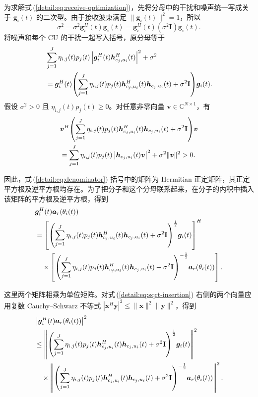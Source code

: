 \documentclass[11pt,a4paper]{ctexart}
\begin{document}
为求解式\,(\ref{detail:eq:receive-optimization})，先将分母中的干扰和噪声统一写成关于 $\bm g_i(t)$ 的二次型。由于接收波束满足 $\|\bm g_i(t)\|^2=1$，所以
\begin{equation}
\sigma^2=\sigma^2\bm g_i^H(t)\bm g_i(t)
=\bm g_i^H(t)(\sigma^2\mathbf I)\bm g_i(t).
\end{equation}
将噪声和每个 CU 的干扰一起写入括号，原分母等于
\begin{align}\label{detail:eq:denominator}
&\sum_{j=1}^J\eta_{i,j}(t)p_j(t)
\left|\bm g_i^H(t)\bm h_{c_j,u_i}^{H}(t)\right|^2+\sigma^2\notag\\
&=\bm g_i^H(t)\!\left(\sum_{j=1}^J\eta_{i,j}(t)p_j(t)
\bm h_{c_j,u_i}^{H}(t)\bm h_{c_j,u_i}(t)+\sigma^2\mathbf I\right)\!\bm g_i(t).
\end{align}
假设 $\sigma^2>0$ 且 $\eta_{i,j}(t)p_j(t)\ge0$。对任意非零向量 $\bm v\in\mathbb C^{N\times1}$，有
\begin{align}
&\bm v^H\!\left(\sum_{j=1}^J\eta_{i,j}(t)p_j(t)
\bm h_{c_j,u_i}^{H}(t)\bm h_{c_j,u_i}(t)+\sigma^2\mathbf I\right)\!\bm v\notag\\
&=\sum_{j=1}^J\eta_{i,j}(t)p_j(t)
\left|\bm h_{c_j,u_i}(t)\bm v\right|^2+\sigma^2\|\bm v\|^2>0.
\end{align}
\begin{samepage}
因此，式\,(\ref{detail:eq:denominator}) 括号中的矩阵为 Hermitian 正定矩阵，其正定平方根及逆平方根均存在。为了把分子和这个分母联系起来，在分子的内积中插入该矩阵的平方根及逆平方根，得到
\begin{align}\label{detail:eq:sqrt-insertion}
&\bm g_i^H(t)\bm a_r(\theta_i(t))\notag\\
&=\left[\left(\sum_{j=1}^J\eta_{i,j}(t)p_j(t)
\bm h_{c_j,u_i}^{H}(t)\bm h_{c_j,u_i}(t)+\sigma^2\mathbf I\right)^{\frac12}\!\bm g_i(t)\right]^H\notag\\
&\quad\times\left[\left(\sum_{j=1}^J\eta_{i,j}(t)p_j(t)
\bm h_{c_j,u_i}^{H}(t)\bm h_{c_j,u_i}(t)+\sigma^2\mathbf I\right)^{-\frac12}\!\bm a_r(\theta_i(t))\right].
\end{align}
\end{samepage}
\begin{samepage}
这里两个矩阵相乘为单位矩阵。对式\,(\ref{detail:eq:sqrt-insertion}) 右侧的两个向量应用复数 Cauchy--Schwarz 不等式 $|\bm x^H\bm y|^2\le\|\bm x\|^2\|\bm y\|^2$，得到
\begin{align}\label{detail:eq:cs-norms}
&\left|\bm g_i^H(t)\bm a_r(\theta_i(t))\right|^2\notag\\
&\le\left\|\left(\sum_{j=1}^J\eta_{i,j}(t)p_j(t)
\bm h_{c_j,u_i}^{H}(t)\bm h_{c_j,u_i}(t)+\sigma^2\mathbf I\right)^{\frac12}\!\bm g_i(t)\right\|^2\notag\\
&\quad\times\left\|\left(\sum_{j=1}^J\eta_{i,j}(t)p_j(t)
\bm h_{c_j,u_i}^{H}(t)\bm h_{c_j,u_i}(t)+\sigma^2\mathbf I\right)^{-\frac12}\!\bm a_r(\theta_i(t))\right\|^2.
\end{align}
\end{samepage}
\end{document}
